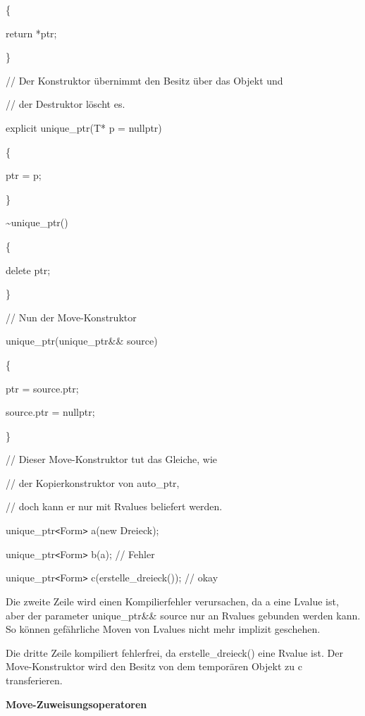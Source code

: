 \documentclass{article}
\begin{document}
\parindent=28pt
\{        

return *ptr;    

\parindent=43pt
\}

\parindent=0pt
// Der Konstruktor übernimmt den Besitz über das Objekt und

// der Destruktor löscht es.    

\parindent=14pt
explicit unique\_ptr(T* p = nullptr)    

\{        

\parindent=43pt
ptr = p;    

\parindent=14pt
\}    

\vspace{12pt}
\textasciitilde{}unique\_ptr()    

\parindent=28pt
\{        

delete ptr;    

\parindent=43pt
\}

\parindent=0pt
// Nun der Move-Konstruktor    

unique\_ptr(unique\_ptr\&\& source)    

\parindent=14pt
\{        

\parindent=28pt
ptr = source.ptr;        

source.ptr = nullptr;    

\parindent=43pt
\}

\parindent=0pt
// Dieser Move-Konstruktor tut das Gleiche, wie

// der Kopierkonstruktor von auto\_ptr,

// doch kann er nur mit Rvalues beliefert werden.

unique\_ptr\texttt{<}Form\texttt{>} a(new Dreieck);

unique\_ptr\texttt{<}Form\texttt{>} b(a);                  // Fehler

unique\_ptr\texttt{<}Form\texttt{>} c(erstelle\_dreieck()); // okay

\vspace{12pt}
Die zweite Zeile wird einen Kompilierfehler verursachen, da a eine Lvalue ist, 
aber der parameter unique\_ptr\&\& source nur an Rvalues gebunden werden kann. 
So können gefährliche Moven von Lvalues nicht mehr implizit geschehen.

Die dritte Zeile kompiliert fehlerfrei, da erstelle\_dreieck() eine Rvalue ist. 
Der Move-Konstruktor wird den Besitz von dem temporären Objekt zu c transferieren.

\vspace{12pt}
\textbf{Move-Zuweisungsoperatoren}
\end{document}
